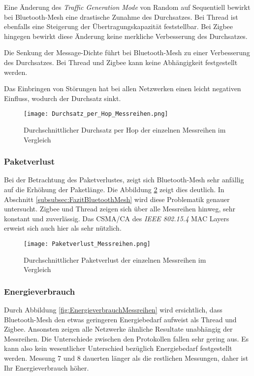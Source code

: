 Eine Änderung des \textit{Traffic Generation Mode} von Random auf Sequentiell bewirkt bei Bluetooth-Mesh eine drastische Zunahme des Durchsatzes.
Bei Thread ist ebenfalls eine Steigerung der Übertragungskapazität feststellbar.
Bei Zigbee hingegen bewirkt diese Änderung keine merkliche Verbesserung des Durchsatzes.

Die Senkung der Message-Dichte führt bei Bluetooth-Mesh zu einer Verbesserung des Durchsatzes. Bei Thread und Zigbee kann keine Abhängigkeit festgestellt werden.

Das Einbringen von Störungen hat bei allen Netzwerken einen leicht negativen Einfluss, wodurch der Durchsatz sinkt. 

\begin{figure}[H]
	\centering
	\texttt{[image: Durchsatz\_per\_Hop\_Messreihen.png]}
	\caption{Durchschnittlicher Durchsatz per Hop der einzelnen Messreihen im Vergleich}\label{fig:Durchsätze_per_Hop_Messreihen}
\end{figure}

\subsubsection{Paketverlust}\label{subsec:VergleichPaketverlustMessreihen}
Bei der Betrachtung des Paketverlustes, zeigt sich Bluetooth-Mesh sehr anfällig auf die Erhöhung der Paketlänge.
Die Abbildung \ref{fig:PaketverlusteMessreihen} zeigt dies deutlich.
In Abschnitt \ref{subsubsec:FazitBluetoothMesh} wird diese Problematik genauer untersucht.
Zigbee und Thread zeigen sich über alle Messreihen hinweg, sehr konstant und zuverlässig.
Das CSMA\slash CA des \textit{IEEE 802.15.4} MAC Layers erweist sich auch hier als sehr nützlich.


\begin{figure}
	\centering
	\texttt{[image: Paketverlust\_Messreihen.png]}
	\caption{Durchschnittlicher Paketverlust der einzelnen Messreihen im Vergleich}\label{fig:PaketverlusteMessreihen}
\end{figure}

\newpage
\subsubsection{Energieverbrauch}\label{subsec:VergleichEnergieverbrauchMessreihen}
Durch Abbildung \ref{fig:EnergieverbrauchMessreihen} wird ersichtlich, dass Bluetooth-Mesh den etwas geringeren Energiebedarf aufweist als Thread und Zigbee. Ansonsten zeigen alle Netzwerke ähnliche Resultate unabhängig der Messreihen.
Die Unterschiede zwischen den Protokollen fallen sehr gering aus.
Es kann also kein wesentlicher Unterschied bezüglich Energiebedarf festgestellt werden. Messung 7 und 8 dauerten länger als die restlichen Messungen, daher ist Ihr Energieverbrauch höher.

